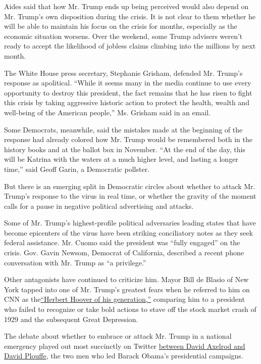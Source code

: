 Aides said that how Mr. Trump ends up being perceived would also depend
on Mr. Trump's own disposition during the crisis. It is not clear to
them whether he will be able to maintain his focus on the crisis for
months, especially as the economic situation worsens. Over the weekend,
some Trump advisers weren't ready to accept the likelihood of jobless
claims climbing into the millions by next month.

The White House press secretary, Stephanie Grisham, defended Mr. Trump's
response as apolitical. ``While it seems many in the media continue to
use every opportunity to destroy this president, the fact remains that
he has risen to fight this crisis by taking aggressive historic action
to protect the health, wealth and well-being of the American people,''
Ms. Grisham said in an email.

Some Democrats, meanwhile, said the mistakes made at the beginning of
the response had already colored how Mr. Trump would be remembered both
in the history books and at the ballot box in November. ``At the end of
the day, this will be Katrina with the waters at a much higher level,
and lasting a longer time,'' said Geoff Garin, a Democratic pollster.

But there is an emerging split in Democratic circles about whether to
attack Mr. Trump's response to the virus in real time, or whether the
gravity of the moment calls for a pause in negative political
advertising and attacks.

Some of Mr. Trump's highest-profile political adversaries leading states
that have become epicenters of the virus have been striking conciliatory
notes as they seek federal assistance. Mr. Cuomo said the president was
``fully engaged'' on the crisis. Gov. Gavin Newsom, Democrat of
California, described a recent phone conversation with Mr. Trump as ``a
privilege.''

Other antagonists have continued to criticize him. Mayor Bill de Blasio
of New York tapped into one of Mr. Trump's greatest fears when he
referred to him on CNN as
the\href{https://www.fox5ny.com/news/de-blasio-to-trump-lack-of-military-mobilization-is-immoral}{``Herbert
Hoover of his generation,''} comparing him to a president who failed to
recognize or take bold actions to stave off the stock market crash of
1929 and the subsequent Great Depression.

The debate about whether to embrace or attack Mr. Trump in a national
emergency played out most succinctly on Twitter
\href{https://twitter.com/davidplouffe/status/1240306292788301824}{between
David Axelrod and David Plouffe}, the two men who led Barack Obama's
presidential campaigns.


